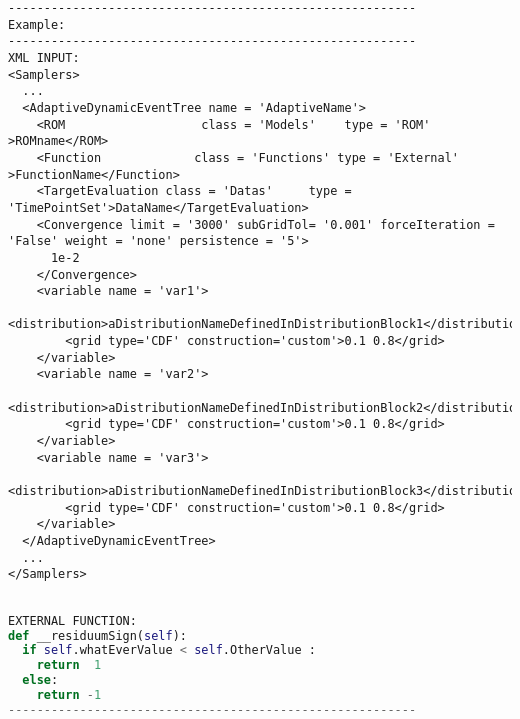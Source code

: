 \begin{lstlisting}[style=XML]
---------------------------------------------------------
Example:
---------------------------------------------------------
XML INPUT:
<Samplers>
  ...
  <AdaptiveDynamicEventTree name = 'AdaptiveName'>
    <ROM                   class = 'Models'    type = 'ROM'            >ROMname</ROM>
    <Function             class = 'Functions' type = 'External'      >FunctionName</Function>
    <TargetEvaluation class = 'Datas'     type = 'TimePointSet'>DataName</TargetEvaluation>
    <Convergence limit = '3000' subGridTol= '0.001' forceIteration = 'False' weight = 'none' persistence = '5'>
      1e-2
    </Convergence>
    <variable name = 'var1'>
        <distribution>aDistributionNameDefinedInDistributionBlock1</distribution> 
        <grid type='CDF' construction='custom'>0.1 0.8</grid>
    </variable>
    <variable name = 'var2'>
        <distribution>aDistributionNameDefinedInDistributionBlock2</distribution> 
        <grid type='CDF' construction='custom'>0.1 0.8</grid>
    </variable>
    <variable name = 'var3'>
        <distribution>aDistributionNameDefinedInDistributionBlock3</distribution> 
        <grid type='CDF' construction='custom'>0.1 0.8</grid>
    </variable>
  </AdaptiveDynamicEventTree>
  ...
</Samplers>
\end{lstlisting} 
\begin{lstlisting}[language=python]

EXTERNAL FUNCTION:
def __residuumSign(self):
  if self.whatEverValue < self.OtherValue : 
    return  1
  else: 
    return -1
---------------------------------------------------------
\end{lstlisting} 

























